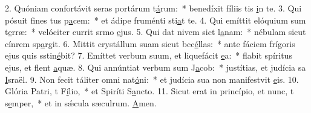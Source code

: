 2. Quóniam confortávit seras portárum t\uline{á}rum:~* benedíxit fíliis tis \uline{i}n te.
3. Qui pósuit fines tus p\uline{a}cem:~* et ádipe fruménti sti\uline{a}t te.
4. Qui emíttit elóquium sum t\uline{e}rræ:~* velóciter currit srmo \uline{e}jus.
5. Qui dat nivem sict l\uline{a}nam:~* nébulam sicut cínrem sp\uline{a}rgit.
6. Mittit crystállum suam sicut bcc\uline{é}llas:~* ante fáciem frígoris ejus quis sstin\uline{é}bit?
7. Emíttet verbum suum, et liquefácit \uline{e}a:~* flabit spíritus ejus, et flent \uline{a}quæ.
8. Qui annúntiat verbum sum J\uline{a}cob:~* justítias, et judícia sa \uline{I}sraël.
9. Non fecit táliter omni nat\uline{ó}ni:~* et judícia sua non manifestvit \uline{e}is.
10. Glória Patri, t F\uline{í}lio,~* et Spiríti S\uline{a}ncto.
11. Sicut erat in princípio, et nunc, t s\uline{e}mper,~* et in sǽcula sæculrum. \uline{A}men.

